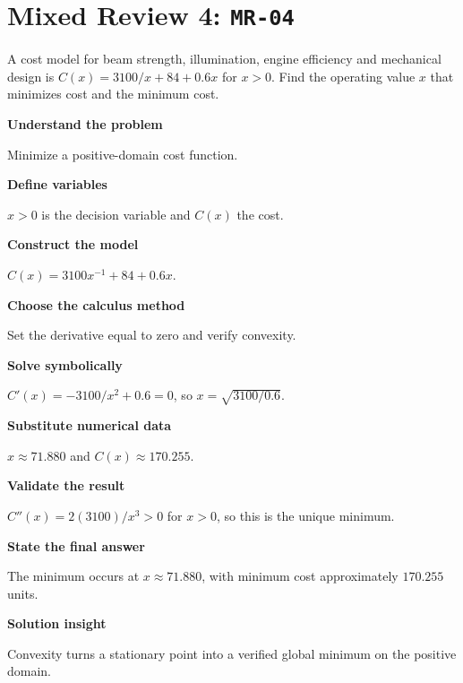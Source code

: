 \documentclass[11pt]{book}
\newcommand{\pid}[1]{\texttt{#1}}
\begin{document}
\section*{Mixed Review 4: \pid{MR-04}}
\begin{problembox}A cost model for beam strength, illumination, engine efficiency and mechanical design is $C(x)=3100/x+84+0.6x$ for $x>0$. Find the operating value $x$ that minimizes cost and the minimum cost.\end{problembox}
\begin{solutionbox}
\textbf{Understand the problem}\par Minimize a positive-domain cost function.\par\medskip
\textbf{Define variables}\par $x>0$ is the decision variable and $C(x)$ the cost.\par\medskip
\textbf{Construct the model}\par $C(x)=3100x^{-1}+84+0.6x$.\par\medskip
\textbf{Choose the calculus method}\par Set the derivative equal to zero and verify convexity.\par\medskip
\textbf{Solve symbolically}\par $C'(x)=-3100/x^2+0.6=0$, so $x=\sqrt{3100/0.6}$.\par\medskip
\textbf{Substitute numerical data}\par $x\approx 71.880$ and $C(x)\approx 170.255$.\par\medskip
\textbf{Validate the result}\par $C''(x)=2(3100)/x^3>0$ for $x>0$, so this is the unique minimum.\par\medskip
\textbf{State the final answer}\par The minimum occurs at $x\approx 71.880$, with minimum cost approximately $170.255$ units.\par\medskip
\textbf{Solution insight}\par Convexity turns a stationary point into a verified global minimum on the positive domain.\par\medskip
\end{solutionbox}
\end{document}
